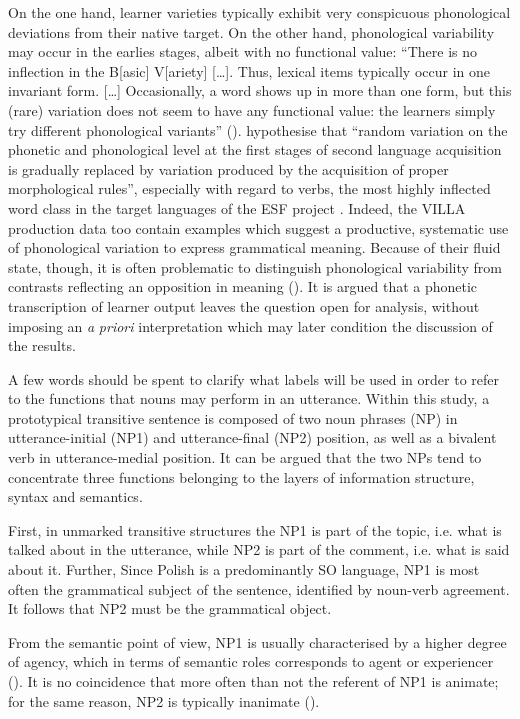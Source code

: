 On the one hand, learner varieties typically exhibit very conspicuous phonological deviations from their native target. On the other hand, phonological variability may occur in the earlies stages, albeit with no functional value: “There is no inflection in the B[asic] V[ariety] […]. Thus, lexical items typically occur in one invariant form. […] Occasionally, a word shows up in more than one form, but this (rare) variation does not seem to have any functional value: the learners simply try different phonological variants” (\citealt[311]{KleinPerdue1997}). \citet[160—161]{BroederEtAl1993} hypothesise that “random variation on the phonetic and phonological level at the first stages of second language acquisition is gradually replaced by variation produced by the acquisition of proper morphological rules”, especially with regard to verbs, the most highly inflected word class in the target languages of the ESF project \citep{Perdue1993}. Indeed, the VILLA production data too contain examples which suggest a productive, systematic use of phonological variation to express grammatical meaning. Because of their fluid state, though, it is often problematic to distinguish phonological variability from contrasts reflecting an opposition in meaning (\citealt{Bernini2018Fonetica, Bernini2018Pattern, Dimroth2018}). It is argued that a phonetic transcription of learner output leaves the question open for analysis, without imposing an \textit{a} \textit{priori} interpretation which may later condition the discussion of the results.

A few words should be spent to clarify what labels will be used in order to refer to the functions that nouns may perform in an utterance. Within this study, a prototypical transitive sentence is composed of two noun phrases (NP) in utterance-initial (NP1) and utterance-final (NP2) position, as well as a bivalent verb in utterance-medial position. It can be argued that the two NPs tend to concentrate three functions belonging to the layers of information structure, syntax and semantics.

First, in unmarked transitive structures the NP1 is part of the topic, i.e. what is talked about in the utterance, while NP2 is part of the comment, i.e. what is said about it. Further, Since Polish is a predominantly SO language, NP1 is most often the grammatical subject of the sentence, identified by noun-verb agreement. It follows that NP2 must be the grammatical object.

From the semantic point of view, NP1 is usually characterised by a higher degree of agency, which in terms of semantic roles corresponds to agent or experiencer (). It is no coincidence that more often than not the referent of NP1 is animate; for the same reason, NP2 is typically inanimate ().


